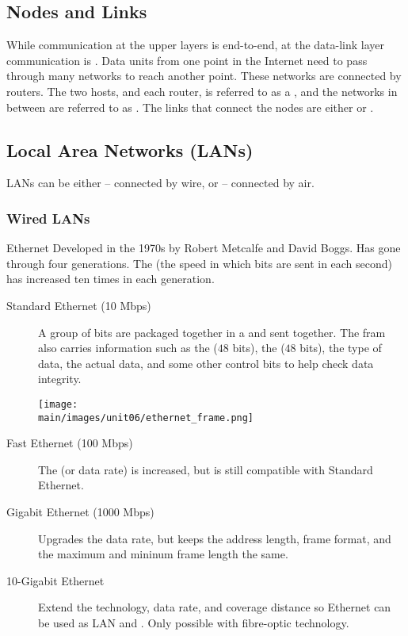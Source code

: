 \documentclass[\main/notes.tex]{subfiles}
\begin{document}
			\subsection{Nodes and Links}
				While communication at the upper layers is end-to-end, at the data-link layer communication is .
				Data units from one point in the Internet need to pass through many networks to reach another point. These networks are connected by routers. The two hosts, and each router, is referred to as a , and the networks in between are referred to as .
				The links that connect the nodes are either  or .
			\subsection{Local Area Networks (LANs)}
				LANs can be either  -- connected by wire, or  -- connected by air.
				\subsubsection{Wired LANs}
					\begin{definition}{Ethernet}
						Developed in the 1970s by Robert Metcalfe and David Boggs. Has gone through four generations. The  (the speed in which bits are sent in each second) has increased ten times in each generation.
						\begin{indentparagraph}
							\begin{description}
								\item[Standard Ethernet (10 Mbps)] A group of bits are packaged together in a  and sent together. The fram also carries information such as the  ($48$ bits), the  ($48$ bits), the type of data, the actual data, and some other control bits to help check data integrity.
									\begin{center}
										\texttt{[image: \\main/images/unit06/ethernet\_frame.png]}
									\end{center}
								\pagebreak
								\item[Fast Ethernet (100 Mbps)] The  (or data rate) is increased, but is still compatible with Standard Ethernet.
								\item[Gigabit Ethernet (1000 Mbps)] Upgrades the data rate, but keeps the address length, frame format, and the maximum and mininum frame length the same.
								\item[10-Gigabit Ethernet] Extend the technology, data rate, and coverage distance so Ethernet can be used as LAN and . Only possible with fibre-optic technology. 
							\end{description}
						\end{indentparagraph}
					\end{definition}
\end{document}
